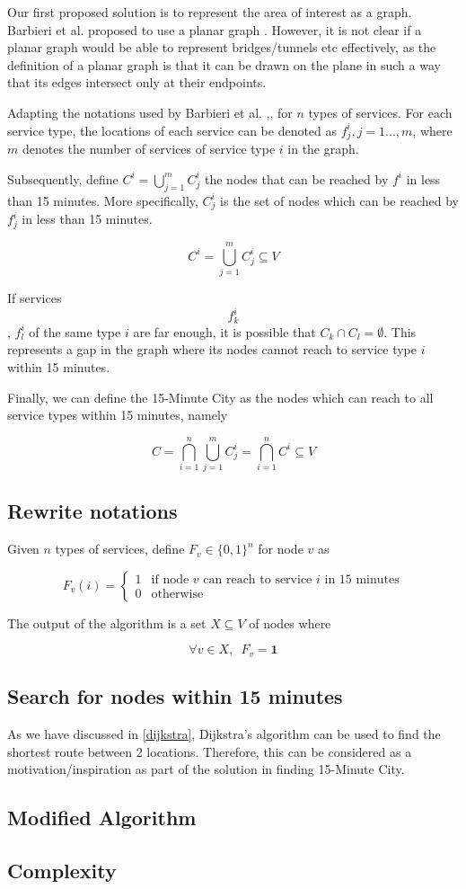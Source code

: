 Our first proposed solution is to represent the area of interest as a graph. Barbieri et al. proposed to use a planar graph \cite{barbieri_graph_2023}. However, it is not clear if a planar graph would be able to represent bridges/tunnels etc effectively, as the definition of a planar graph is that it can be drawn on the plane in such a way that its edges intersect only at their endpoints.

Adapting the notations used by Barbieri et al. \cite{barbieri_graph_2023},, for $n$ types of services. For each service type, the locations of each service can be denoted as $f^i_j,j=1...,m$, where $m$ denotes the number of services of service type $i$ in the graph.

Subsequently, define $C^i=\bigcup\limits_{j=1}^m C^i_j$ the nodes that can be reached by $f^i$ in less than 15 minutes. More specifically, $C^i_j$ is the set of nodes which can be reached by $f^i_j$ in less than 15 minutes.

$$ C^i=\bigcup\limits_{j=1}^m C^i_j\subseteq V $$

If services $$f^i_k$$, $f^i_l$ of the same type $i$ are far enough, it is possible that $C_k\cap C_l=\emptyset$. This represents a gap in the graph where its nodes cannot reach to service type $i$ within 15 minutes.

Finally, we can define the 15-Minute City as the nodes which can reach to all service types within 15 minutes, namely

$$ C=\bigcap\limits_{i=1}^n\bigcup\limits_{j=1}^m C^i_j=\bigcap\limits_{i=1}^n C^i\subseteq V $$

\subsection{Rewrite notations}

Given $n$ types of services, define $F_v\in\{0,1\}^n$ for node $v$ as

$$ F_v(i) = \begin{cases}1&\text{if node }v\text{ can reach to service }i\text{ in 15 minutes}\\0&\text{otherwise}\end{cases} $$

The output of the algorithm is a set $X\subseteq V$ of nodes where

$$ \forall v\in X,\enspace F_v=\mathbf{1} $$

\subsection{Search for nodes within 15 minutes}

As we have discussed in \ref{dijkstra}, Dijkstra's algorithm can be used to find the shortest route between 2 locations. Therefore, this can be considered as a motivation/inspiration as part of the solution in finding 15-Minute City.

\subsection{Modified Algorithm}

\subsection{Complexity}